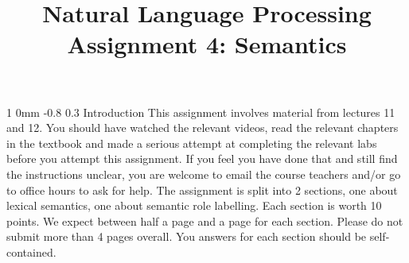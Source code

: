 \documentclass[11pt]{article}
\title{{\LARGE Natural Language Processing}\\[1.5mm]{\large Assignment 4: Semantics}}
\author{}
\date{} %
\makeatletter
\renewcommand{\section}{\@startsection
{section}%
{1}%
{0mm}%
{-0.8\baselineskip}%
{0.3\baselineskip}%
{\bfseries\large}}%
\makeatother
\begin{document}
 


\maketitle
\section{Introduction}
\noindent This assignment involves material from lectures 11 and
12. You should have watched the relevant videos, read the relevant
chapters in the textbook and made a serious attempt at completing the
relevant labs before you attempt this assignment.  If you feel you
have done that and still find the instructions unclear, you are
welcome to email the course teachers and/or go to office hours to ask
for help.  The assignment is split into 2 sections, one about lexical
semantics, one about semantic role labelling. Each section is worth 10
points. We expect between half a page and a page for each
section. Please do not submit more than 4 pages overall.  You answers
for each section should be self-contained.
\end{document}
